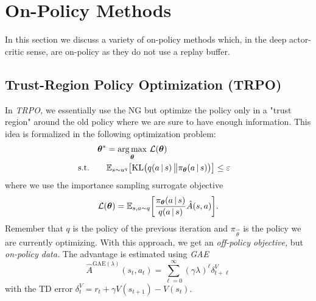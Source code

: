 	\section{On-Policy Methods}
		In this section we discuss a variety of on-policy methods which, in the deep actor-critic sense, are on-policy as they do not use a replay buffer.

		\subsection{Trust-Region Policy Optimization (\acs{TRPO})}
			In \emph{\ac{TRPO},} we essentially use the \ac{NG} but optimize the policy only in a "trust region" around the old policy where we are sure to have enough information. This idea is formalized in the following optimization problem:
			\begin{equation}
				\begin{aligned}
					\bm{\theta}^\ast & = \operatorname*{arg\,max}_{\bm{\theta}} \, \mathcal{L}(\bm{\theta}) \\
					\text{s.t.}\qquad &
					\begin{aligned}
						\mathbb{E}_{s \sim u^q}\bigl[ \operatorname{KL}\bigl( q(a \,\vert\, s) \,\big\Vert \pi_{\bm{\theta}}(a \,\vert\, s) \bigr) \bigr] & \leq \varepsilon
					\end{aligned}
				\end{aligned}
			\end{equation}
			where we use the importance sampling surrogate objective
			\begin{equation}
				\mathcal{L}(\bm{\theta}) = \mathbb{E}_{s, a \sim q}\biggl[ \frac{\pi_{\bm{\theta}}(a \,\vert\, s)}{q(a \,\vert\, s)} \hat{A}(s, a) \biggr].
			\end{equation}
			Remember that \(q\) is the policy of the previous iteration and \(\pi_{\vec{\theta}}\) is the policy we are currently optimizing. With this approach, we get an \emph{off-policy objective,} but \emph{on-policy data.} The advantage is estimated using \emph{\ac{GAE}}
			\begin{equation}
				\hat{A}^{\mathrm{GAE}(\lambda)}(s_t, a_t) = \sum_{\ell = 0}^{\infty} (\gamma \lambda)^\ell \delta_{t + \ell}^V
			\end{equation}
			with the \ac{TD} error \( \delta_t^V = r_t + \gamma V(s_{t + 1}) - V(s_t) \).


